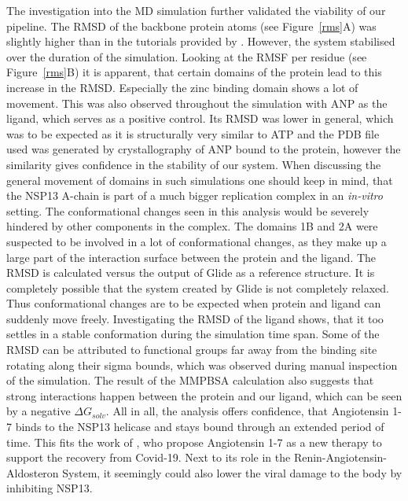\documentclass[11pt, letterpaper, titlepage]{article}
\renewcommand{\cite}{\parencite}
\begin{document}
\noindent The investigation into the \acf{MD} simulation further validated the viability of our pipeline. The RMSD of the backbone protein atoms (see Figure~\ref{rms}A) was slightly higher than in the tutorials provided by \textcite{Lemkul2018}. However, the system stabilised over the duration of the simulation. Looking at the RMSF per residue (see Figure~\ref{rms}B) it is apparent, that certain domains of the protein lead to this increase in the RMSD. Especially the zinc binding domain shows a lot of movement. This was also observed throughout the simulation with ANP as the ligand, which serves as a positive control. Its RMSD was lower in general, which was to be expected as it is structurally very similar to ATP and the PDB file used was generated by crystallography of ANP bound to the protein, however the similarity gives confidence in the stability of our system. When discussing the general movement of domains in such simulations one should keep in mind, that the NSP13 A-chain is part of a much bigger replication complex \cite{NSP13_basics} in an \textit{in-vitro} setting. The conformational changes seen in this analysis would be severely hindered by other components in the complex. The domains 1B and 2A were suspected to be involved in a lot of conformational changes, as they make up a large part of the interaction surface between the protein and the ligand. The RMSD is calculated versus the output of Glide as a reference structure. It is completely possible that the system created by Glide is not completely relaxed. Thus conformational changes are to be expected when protein and ligand can suddenly move freely. Investigating the RMSD of the ligand shows, that it too settles in a stable conformation during the simulation time span. Some of the RMSD can be attributed to functional groups far away from the binding site rotating along their sigma bounds, which was observed during manual inspection of the simulation. The result of the MMPBSA calculation also suggests that strong interactions happen between the protein and our ligand, which can be seen by a negative $\Delta G_{solv}$.
All in all, the analysis offers confidence, that Angiotensin 1-7 binds to the NSP13 helicase and stays bound through an extended period of time. This fits the work of \textcite{angio}, who propose Angiotensin 1-7 as a new therapy to support the recovery from Covid-19. Next to its role in the Renin-Angiotensin-Aldosteron System, it seemingly could also lower the viral damage to the body by inhibiting NSP13.
\end{document}
